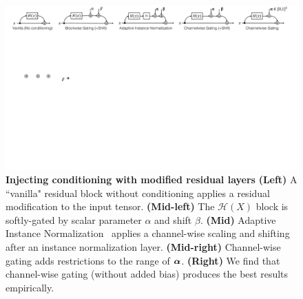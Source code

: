 \begin{figure}[t]
    \centering
    \includegraphics[width=1.\linewidth]{paper_images/arch_gate3.pdf}
    \vspace{-4mm}
    \caption{
    {\bf Injecting conditioning with modified residual layers} {\bf (Left)} A ``vanilla" residual block without conditioning applies a residual modification to the input tensor. {\bf (Mid-left)} The $\mathcal{H}(X)$ block is softly-gated by scalar parameter $\alpha$ and shift $\beta$. {\bf (Mid)} Adaptive Instance Normalization~\cite{huang2017arbitrary} applies a channel-wise scaling and shifting after an instance normalization layer. {\bf (Mid-right)} Channel-wise gating adds restrictions to the range of $\mbox{\boldmath $\alpha$}$. {\bf (Right)} We find that channel-wise gating (without added bias) produces the best results empirically.\label{fig:arch-gate2}
    \vspace{-2mm}
    }
\end{figure}


